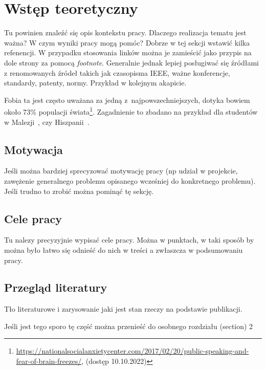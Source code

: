 \section{Wstęp teoretyczny}

Tu powinien znaleźć się opis kontekstu pracy. Dlaczego realizacja tematu jest ważna? W czym wyniki pracy mogą pomóc? Dobrze w tej sekcji wstawić kilka refenencji. W przypadku stosowania linków można je zamieścić jako przypis na dole strony za pomocą \textit{footnote}. Generalnie jednak lepiej posługiwać się źródłami z renomowanych źródeł takich jak czasopisma IEEE, ważne konferencje, standardy, patenty, normy. Przykład w kolejnym akapicie. 

Fobia ta jest często uważana za jedną z~najpowszechniejszych, dotyka bowiem około 73\% populacji świata\footnote{\url{https://nationalsocialanxietycenter.com/2017/02/20/public-speaking-and-fear-of-brain-freezes/}, (dostęp 10.10.2022) }. Zagadnienie to zbadano na przykład dla studentów w Malezji~\cite{tse2012glossophobia}, czy Hiszpanii~\cite{marques2021glossophobia}.

\subsection{Motywacja}
\label{subsec:motywacja}

Jeśli można bardziej sprecyzować motywację pracy (np udział w projekcie, zawężenie generalnego problemu opisanego wcześniej do konkretnego problemu). Jeśli trudno to zrobić można pominąć tę sekcję.


\subsection{Cele pracy}
\label{subsec:cele_pracy}
Tu nalezy precyzyjnie wypisać cele pracy. Można w punktach, w taki sposób by można było łatwo się odnieść do nich w treści a zwłaszcza w podsumowaniu pracy.

\subsection{Przegląd literatury}
Tło literaturowe i zarysowanie jaki jest stan rzeczy na podstawie publikacji.

Jeśli jest tego sporo tę część można przenieść do osobnego rozdziału (section) 2
